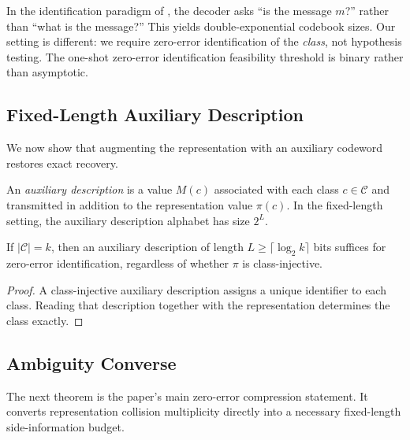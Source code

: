 \begin{remark}
In the identification paradigm of \cite{ahlswede1989identification}, the decoder asks ``is the message $m$?'' rather than ``what is the message?'' This yields double-exponential codebook sizes. Our setting is different: we require zero-error identification of the \emph{class}, not hypothesis testing. The one-shot zero-error identification feasibility threshold is binary rather than asymptotic.
\end{remark}

\subsection{Fixed-Length Auxiliary Description}

We now show that augmenting the representation with an auxiliary codeword restores exact recovery.

\begin{definition}
An \emph{auxiliary description} is a value $M(c)$ associated with each class $c \in \mathcal C$ and transmitted in addition to the representation value $\pi(c)$. In the fixed-length setting, the auxiliary description alphabet has size $2^L$.
\end{definition}

\begin{theorem}\label{thm:tag-restored-sufficiency}
If $|\mathcal C|=k$, then an auxiliary description of length $L \geq \lceil \log_2 k \rceil$ bits suffices for zero-error identification, regardless of whether $\pi$ is class-injective.
\end{theorem}

\begin{proof}
A class-injective auxiliary description assigns a unique identifier to each class. Reading that description together with the representation determines the class exactly.
\end{proof}

\subsection{Ambiguity Converse}

The next theorem is the paper's main zero-error compression statement. It converts representation collision multiplicity directly into a necessary fixed-length side-information budget.

